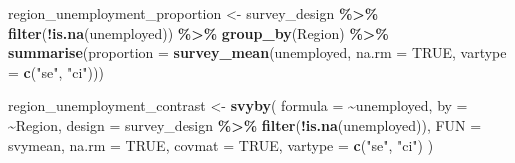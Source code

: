 \documentclass[
  english,
  12pt,
]{book}
\newenvironment{Shaded}{\begin{snugshade}}{\end{snugshade}}
\newcommand{\AttributeTok}[1]{\textcolor[rgb]{0.13,0.29,0.53}{#1}}
\newcommand{\ConstantTok}[1]{\textcolor[rgb]{0.56,0.35,0.01}{#1}}
\newcommand{\FunctionTok}[1]{\textcolor[rgb]{0.13,0.29,0.53}{\textbf{#1}}}
\newcommand{\NormalTok}[1]{#1}
\newcommand{\OtherTok}[1]{\textcolor[rgb]{0.56,0.35,0.01}{#1}}
\newcommand{\SpecialCharTok}[1]{\textcolor[rgb]{0.81,0.36,0.00}{\textbf{#1}}}
\newcommand{\StringTok}[1]{\textcolor[rgb]{0.31,0.60,0.02}{#1}}
\begin{document}
\begin{Shaded}
\begin{Highlighting}[]
\NormalTok{region\_unemployment\_proportion }\OtherTok{\textless{}{-}}\NormalTok{ survey\_design }\SpecialCharTok{\%\textgreater{}\%}
  \FunctionTok{filter}\NormalTok{(}\SpecialCharTok{!}\FunctionTok{is.na}\NormalTok{(unemployed)) }\SpecialCharTok{\%\textgreater{}\%}
  \FunctionTok{group\_by}\NormalTok{(Region) }\SpecialCharTok{\%\textgreater{}\%}
  \FunctionTok{summarise}\NormalTok{(}\AttributeTok{proportion =} \FunctionTok{survey\_mean}\NormalTok{(unemployed,}
                                     \AttributeTok{na.rm =} \ConstantTok{TRUE}\NormalTok{,}
                                     \AttributeTok{vartype =} \FunctionTok{c}\NormalTok{(}\StringTok{"se"}\NormalTok{, }\StringTok{"ci"}\NormalTok{)))}

\NormalTok{region\_unemployment\_contrast }\OtherTok{\textless{}{-}} \FunctionTok{svyby}\NormalTok{(}
  \AttributeTok{formula =} \SpecialCharTok{\textasciitilde{}}\NormalTok{unemployed,}
  \AttributeTok{by =} \SpecialCharTok{\textasciitilde{}}\NormalTok{Region,}
  \AttributeTok{design =}\NormalTok{ survey\_design }\SpecialCharTok{\%\textgreater{}\%}
    \FunctionTok{filter}\NormalTok{(}\SpecialCharTok{!}\FunctionTok{is.na}\NormalTok{(unemployed)),}
  \AttributeTok{FUN =}\NormalTok{ svymean,}
  \AttributeTok{na.rm =} \ConstantTok{TRUE}\NormalTok{,}
  \AttributeTok{covmat =} \ConstantTok{TRUE}\NormalTok{,}
  \AttributeTok{vartype =} \FunctionTok{c}\NormalTok{(}\StringTok{"se"}\NormalTok{, }\StringTok{"ci"}\NormalTok{)}
\NormalTok{)}
\end{Highlighting}
\end{Shaded}
\end{document}
